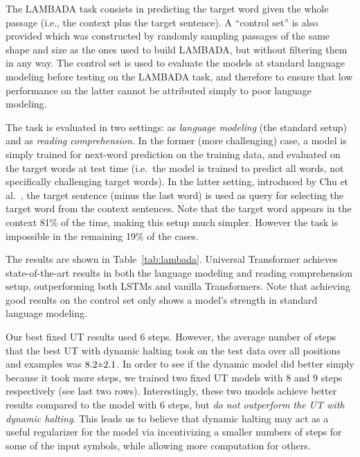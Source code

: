 The LAMBADA task consists in predicting the target word given the whole passage (i.e., the context plus the target sentence). A ``control set''  is also provided which was constructed by randomly sampling passages of the same shape and size as the ones used to build LAMBADA, but without filtering them in any way. The control set is used to evaluate the models at standard language modeling before testing on the LAMBADA task, and therefore to ensure that low performance on the latter cannot be attributed simply to poor language modeling.

The task is evaluated in two settings: as \emph{language modeling} (the standard setup) and as \emph{reading comprehension}. In the former (more challenging) case, a model is simply trained for next-word prediction on the training data, and evaluated on the target words at test time (i.e.\ the model is trained to predict all words, not specifically challenging target words).  In the latter setting, introduced by Chu et al.~\cite{chu2017broad}, the target sentence (minus the last word) is used as query for selecting the target word from the context sentences. Note that the target word appears in the context 81\% of the time, making this setup much simpler. However the task is impossible in the remaining 19\% of the cases.



The results are shown in Table~\ref{tab:lambada}. Universal Transformer achieves state-of-the-art results in both the language modeling and reading comprehension setup, outperforming both LSTMs and vanilla Transformers. Note that achieving good results on the control set only shows a model's strength in standard language modeling.

Our best fixed UT results used 6 steps. However, the average number of steps that the best UT with dynamic halting took on the test data over all positions and examples was $8.2 \rpm 2.1$. In order to see if the dynamic model did better simply because it took more steps, we trained two fixed UT models with 8 and 9 steps respectively (see last two rows). Interestingly, these two models achieve better results compared to the model with 6 steps, but \emph{do not outperform the UT with dynamic halting}. This leads us to believe that dynamic halting may act as a useful regularizer for the model via incentivizing a smaller numbers of steps for some of the input symbols, while allowing more computation for others.


